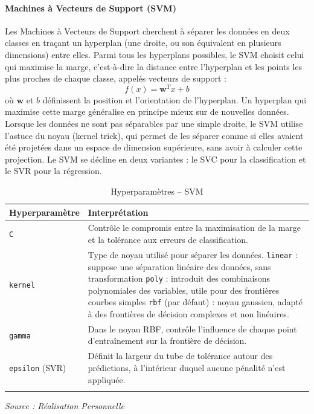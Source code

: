 \documentclass[a4paper,12pt, oneside]{article}
\begin{document}
\paragraph{Machines à Vecteurs de Support (SVM)\\}
Les Machines à Vecteurs de Support cherchent à séparer les données en deux classes en traçant un hyperplan (une droite, ou son équivalent en plusieurs dimensions) entre elles. Parmi tous les hyperplans possibles, le SVM choisit celui qui maximise la marge, c'est-à-dire la distance entre l'hyperplan et les points les plus proches de chaque classe, appelés vecteurs de support :
\[
f(x) = \mathbf{w}^T x + b
\]
où $\mathbf{w}$ et $b$ définissent la position et l'orientation de l'hyperplan. Un hyperplan qui maximise cette marge généralise en principe mieux sur de nouvelles données. Lorsque les données ne sont pas séparables par une simple droite, le SVM utilise l'astuce du noyau (kernel trick), qui permet de les séparer comme si elles avaient été projetées dans un espace de dimension supérieure, sans avoir à calculer cette projection. Le SVM se décline en deux variantes : le SVC pour la classification et le SVR pour la régression.

\begin{longtable}{|m{5cm}|m{12cm}|}
\hline
\textbf{Hyperparamètre} & \textbf{Interprétation} \\
\hline
\texttt{C} & Contrôle le compromis entre la maximisation de la marge et la tolérance aux erreurs de classification. \\
\hline
\texttt{kernel} & Type de noyau utilisé pour séparer les données. \newline \texttt{linear} : suppose une séparation linéaire des données, sans transformation \newline \texttt{poly} : introduit des combinaisons polynomiales des variables, utile pour des frontières courbes simples \newline \texttt{rbf} (par défaut) : noyau gaussien, adapté à des frontières de décision complexes et non linéaires. \\
\hline
\texttt{gamma} & Dans le noyau RBF, contrôle l'influence de chaque point d'entraînement sur la frontière de décision. \\
\hline
\texttt{epsilon} (SVR) & Définit la largeur du tube de tolérance autour des prédictions, à l'intérieur duquel aucune pénalité n'est appliquée. \\
\hline
\caption{Hyperparamètres -- SVM}
\end{longtable}
\begin{center}
\vspace{-0.85cm}
\textit{Source : Réalisation Personnelle}
\end{center}
\end{document}

